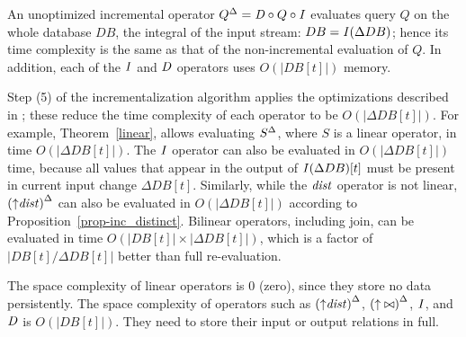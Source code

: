 An unoptimized incremental operator ${Q}^{\Delta} = \mathit{D} \circ Q \circ \mathit{I}$
evaluates query $Q$ on the whole database $DB$, the integral of the input stream:
$DB = \mathit{I}(\Delta DB)$; hence its time complexity  is the same as that of the non-incremental
evaluation of $Q$.  In addition, each of the $\mathit{I}$ and $\mathit{D}$ operators uses $O(|DB[t]|)$ memory.

Step (5) of the incrementalization algorithm applies the optimizations
described in ; these reduce the time
complexity of each operator to be $O(|\Delta DB[t]|)$.  For example,
Theorem~\ref{linear}, allows evaluating ${S}^{\Delta}$, where $S$ is a
linear operator, in time $O(|\Delta DB[t]|)$.  The $\mathit{I}$ operator can
also be evaluated in $O(|\Delta DB[t]|)$ time, because all values that
appear in the output of $\mathit{I}(\Delta DB)[t]$ must be present in current
input change $\Delta DB[t]$.  Similarly, while the $\mathit{dist}$
operator is not linear, ${({\uparrow}\mathit{dist})}^{\Delta}$ can also be
evaluated in $O(|\Delta DB[t]|)$ according to
Proposition~\ref{prop-inc_distinct}.  Bilinear operators, including
join, can be evaluated in time $O(|DB[t]| \times |\Delta DB[t]|)$,
which is a factor of $|DB[t] / \Delta DB[t]|$ better than full
re-evaluation.

The space complexity of linear operators is 0 (zero), since they store no
data persistently.  The space complexity of operators such as ${({\uparrow}\mathit{dist})}^{\Delta}$,
${({\uparrow}\bowtie)}^{\Delta}$, $\mathit{I}$, and $\mathit{D}$ is $O(|DB[t]|)$.  They need
to store their input or output relations in full.
